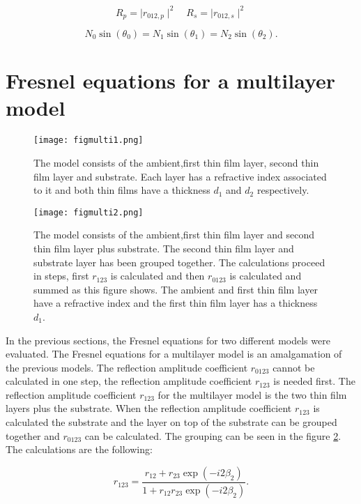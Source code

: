 \documentclass[MasterThesisMain.tex]{subfiles}
\begin{document}
\begin{equation}
R_p=\mid r_{012,p} \mid^2 \quad R_s=\mid r_{012,s} \mid^2
\end{equation}

\begin{equation}
N_0\sin(\theta_0)=N_1\sin(\theta_1)=N_2\sin(\theta_2).
\end{equation} 

\section{Fresnel equations for a multilayer model}\label{ch:fresnelmulti} 

\begin{figure}
\centering
\texttt{[image: figmulti1.png]}
\caption{The model consists of the ambient,first thin film layer, second thin film layer and substrate. Each layer has a refractive index associated to it and both thin films have a thickness $d_1$ and $d_2$ respectively.}
\label{fig:multilayer1}
\end{figure}

\begin{figure}
\centering
\texttt{[image: figmulti2.png]}
\caption{The model consists of the ambient,first thin film layer and second thin film layer plus substrate. The second thin film layer and substrate layer has been grouped together. The calculations proceed in steps, first $r_{123}$ is calculated and then $r_{0123}$ is calculated and summed as this figure shows. The ambient and first thin film layer have a refractive index and the first thin film layer has a thickness $d_1$.}
\label{fig:multilayer2}
\end{figure}


In the previous sections, the Fresnel equations for two different models were evaluated. The Fresnel equations for a multilayer model is an amalgamation of the previous models. The reflection amplitude coefficient $r_{0123}$ cannot be calculated in one step, the reflection amplitude coefficient $r_{123}$ is needed first. The reflection amplitude coefficient $r_{123}$ for the multilayer model is the two thin film layers plus the substrate. When the reflection amplitude coefficient $r_{123}$ is calculated the substrate and the layer on top of the substrate can be grouped together and $r_{0123}$ can be calculated. The grouping can be seen in the figure \ref{fig:multilayer2}. The calculations are the following:

\begin{equation}
r_{123}= \frac{r_{12}+r_{23}\exp(-i2\beta_2)}{1+r_{12}r_{23}\exp(-i2\beta_2)}.
\end{equation}
\end{document}
